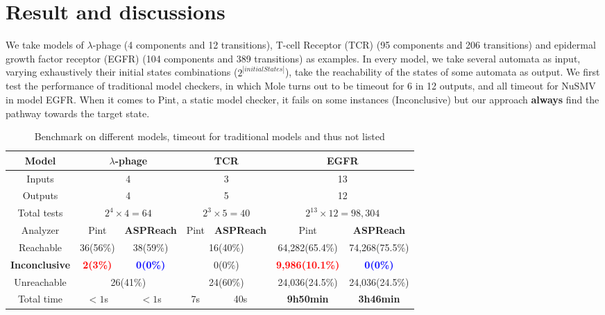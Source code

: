 \documentclass[final]{beamer}
\begin{document}
\begin{frame}[t]{}
\begin{columns}[t]
\begin{column}{.50\linewidth}
\section{Result and discussions}
We take models of $\lambda$-phage \cite{thieffry1995dynamical} (4 components and 12 transitions), T-cell Receptor (TCR) \cite{saez2007logical} (95 components and 206 transitions) and epidermal growth factor receptor (EGFR) (104 components and 389 transitions) \cite{samaga2009logic} as examples. In every model, we take several automata as input, varying exhaustively their initial states combinations ($2^{|initialStates|}$), take the reachability of the states of some automata as output. We first test the performance of traditional model checkers, in which Mole turns out to be timeout for 6 in 12 outputs, and all timeout for NuSMV in model EGFR. When it comes to Pint, a static model checker, it fails on some instances (Inconclusive) but our approach \textbf{always} find the pathway towards the target state.
\begin{table}
\small{
\begin{tabular}{|c|c|c|c|c|c|c|}
    \hline
  	Model	&\multicolumn{2}{c|}{$\lambda$-phage}	&	  \multicolumn{2}{c|}{TCR} & \multicolumn{2}{c|}{EGFR}  \\
    \hline
    Inputs&\multicolumn{2}{c|}{4}	&	  \multicolumn{2}{c|}{3} & \multicolumn{2}{c|}{13}\\
    \hline
    Outputs&\multicolumn{2}{c|}{4} &	  \multicolumn{2}{c|}{5} & \multicolumn{2}{c|}{12} \\
    \hline
    Total tests&\multicolumn{2}{c|}{$2^4\times 4=64$} & \multicolumn{2}{c|}{$2^3\times 5=40$} & \multicolumn{2}{c|}{$2^{13}\times 12=98,304$}\\
    \hline
    Analyzer  &  Pint       &\textbf{ASPReach}    &  Pint       &\textbf{ASPReach}   &  Pint       &\textbf{ASPReach}             \\
    \hline
    Reachable    & 36(56\%)& 38(59\%)   &  \multicolumn{2}{c|}{16(40\%)}  & 64,282(65.4\%)&74,268(75.5\%)\\
    \hline
    \textbf{Inconclusive} & \textcolor{red}{\textbf{2(3\%)}}&\textcolor{blue}{\textbf{0(0\%)}}& \multicolumn{2}{c|}{0(0\%)}    &\textcolor{red}{\textbf{9,986(10.1\%)}}&\textcolor{blue}{\textbf{0(0\%)}}  \\
    \hline
    Unreachable     &  \multicolumn{2}{c|}{26(41\%)} &  \multicolumn{2}{c|}{24(60\%)} &24,036(24.5\%)&24,036(24.5\%)\\
    \hline
    Total time &  $<1$s       &  $<1$s &  7s       &  40s        & \textbf{9h50min}              & \textbf{3h46min}      \\
    \hline
  \end{tabular}
  \caption{Benchmark on different models, timeout for traditional models and thus not listed}
  }
\end{table}





\end{column}
\end{columns}
\end{frame}
\end{document}
